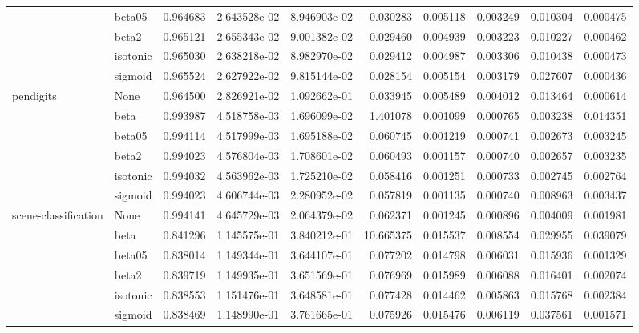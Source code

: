 \begin{tabular}{llrrrrrrrr}
        & beta05 &  0.964683 &  2.643528e-02 &  8.946903e-02 &   0.030283 &  0.005118 &  0.003249 &  0.010304 &  0.000475 \\
        & beta2 &  0.965121 &  2.655343e-02 &  9.001382e-02 &   0.029460 &  0.004939 &  0.003223 &  0.010227 &  0.000462 \\
        & isotonic &  0.965030 &  2.638218e-02 &  8.982970e-02 &   0.029412 &  0.004987 &  0.003306 &  0.010438 &  0.000473 \\
        & sigmoid &  0.965524 &  2.627922e-02 &  9.815144e-02 &   0.028154 &  0.005154 &  0.003179 &  0.027607 &  0.000436 \\
pendigits & None &  0.964500 &  2.826921e-02 &  1.092662e-01 &   0.033945 &  0.005489 &  0.004012 &  0.013464 &  0.000614 \\
        & beta &  0.993987 &  4.518758e-03 &  1.696099e-02 &   1.401078 &  0.001099 &  0.000765 &  0.003238 &  0.014351 \\
        & beta05 &  0.994114 &  4.517999e-03 &  1.695188e-02 &   0.060745 &  0.001219 &  0.000741 &  0.002673 &  0.003245 \\
        & beta2 &  0.994023 &  4.576804e-03 &  1.708601e-02 &   0.060493 &  0.001157 &  0.000740 &  0.002657 &  0.003235 \\
        & isotonic &  0.994032 &  4.563962e-03 &  1.725210e-02 &   0.058416 &  0.001251 &  0.000733 &  0.002745 &  0.002764 \\
        & sigmoid &  0.994023 &  4.606744e-03 &  2.280952e-02 &   0.057819 &  0.001135 &  0.000740 &  0.008963 &  0.003437 \\
scene-classification & None &  0.994141 &  4.645729e-03 &  2.064379e-02 &   0.062371 &  0.001245 &  0.000896 &  0.004009 &  0.001981 \\
        & beta &  0.841296 &  1.145575e-01 &  3.840212e-01 &  10.665375 &  0.015537 &  0.008554 &  0.029955 &  0.039079 \\
        & beta05 &  0.838014 &  1.149344e-01 &  3.644107e-01 &   0.077202 &  0.014798 &  0.006031 &  0.015936 &  0.001329 \\
        & beta2 &  0.839719 &  1.149935e-01 &  3.651569e-01 &   0.076969 &  0.015989 &  0.006088 &  0.016401 &  0.002074 \\
        & isotonic &  0.838553 &  1.151476e-01 &  3.648581e-01 &   0.077428 &  0.014462 &  0.005863 &  0.015768 &  0.002384 \\
        & sigmoid &  0.838469 &  1.148990e-01 &  3.761665e-01 &   0.075926 &  0.015476 &  0.006119 &  0.037561 &  0.001571 \\

\end{tabular}
